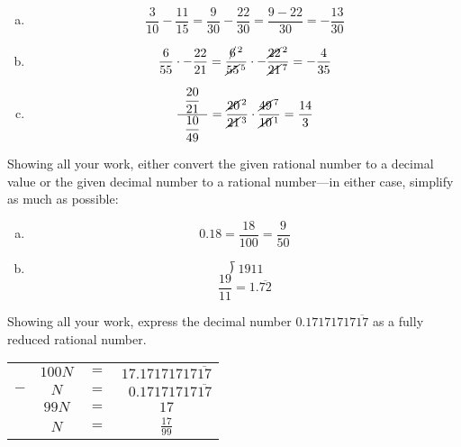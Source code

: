 \documentclass[12pt,letterpaper]{exam}
\begin{document}
\begin{questions}
\sol
\begin{enumerate}[(a)]
\item 
	\[
	\dfrac{3}{10} - \dfrac{11}{15}= \dfrac{9}{30} - \dfrac{22}{30}= \dfrac{9 - 22}{30}= -\dfrac{13}{30}
	\] \pspace

\item 
	\[
	\dfrac{6}{55} \cdot -\dfrac{22}{21}= \dfrac{\cancel{6}^{\,2}}{\cancel{55}^{\,5}} \cdot -\dfrac{\cancel{22}^{\,2}}{\cancel{21}^{\,7}}= -\dfrac{4}{35}
	\] \pspace

\item 
	\[
	\dfrac{\;\;\dfrac{20}{21}\;\;}{\;\;\dfrac{10}{49}\;\;}= \dfrac{\cancel{20}^{\,2}}{\cancel{21}^{\,3}} \cdot \dfrac{\cancel{49}^{\,7}}{\cancel{10}^{\,1}}= \dfrac{14}{3}
	\]
\end{enumerate}



\newpage
\question Showing all your work, either convert the given rational number to a decimal value or the given decimal number to a rational number---in either case, simplify as much as possible:
	 \pspace

\sol
\begin{enumerate}[(a)]
\item  
	\[
	0.18= \dfrac{18}{100}= \dfrac{9}{50}
	\] \pspace

\item 
	\[
	\longdivision{19}{11}
	\]
	\[
	\dfrac{19}{11}= 1.\overline{72}
	\]
\end{enumerate}



\newpage
\question[10] Showing all your work, express the decimal number $0.17171717\overline{17}$ as a fully reduced rational number. \pspace

\sol 
	\begin{table}[!ht]
	\centering\small
	\begin{tabular}{rccc}
	& $100N$ & $=$ & $17.17171717\overline{17}$ \\ 
	$-$ & $N$ & $=$ & $\phantom{1}0.17171717\overline{17}$ \\ \hline
	& $99N$ & $=$ & $17$ \\[0.1cm]
	& $N$ & $=$ & $\frac{17}{99}$ 
	\end{tabular}
	\end{table} \par


\end{questions}
\end{document}
